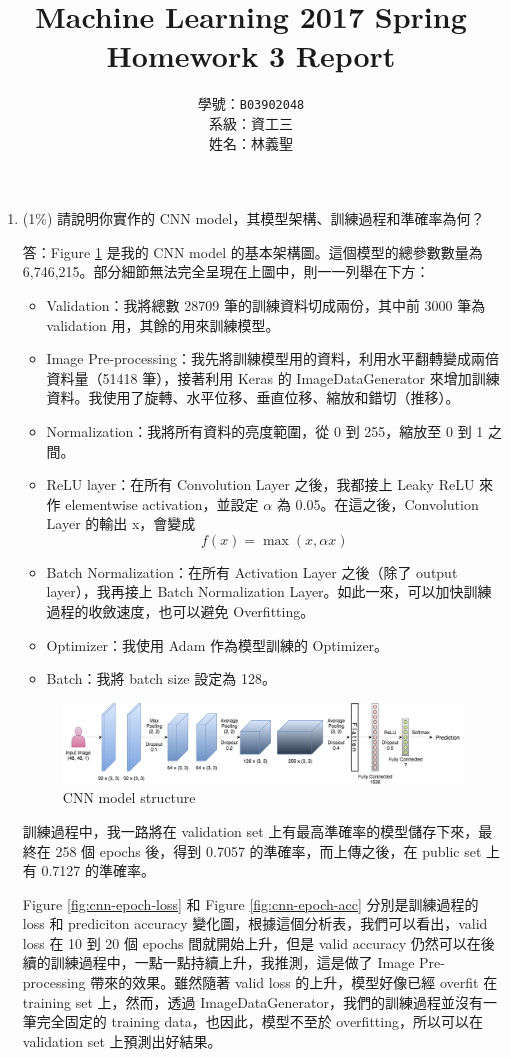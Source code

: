 \documentclass[12pt,a4paper]{extarticle}
\title{Machine Learning 2017 Spring\\Homework 3 Report}
\author{學號：\texttt{B03902048}\\系級：資工三\\姓名：林義聖}
\date{}
\begin{document}
\maketitle

\begin{enumerate}
	\item (1\%) 請說明你實作的 CNN model，其模型架構、訓練過程和準確率為何？
	\par 答：Figure \ref{fig:cnn-model-structure} 是我的 CNN model 的基本架構圖。這個模型的總參數數量為 6,746,215。部分細節無法完全呈現在上圖中，則一一列舉在下方：
  \begin{itemize}
    \item Validation：我將總數 28709 筆的訓練資料切成兩份，其中前 3000 筆為 validation 用，其餘的用來訓練模型。
    \item Image Pre-processing：我先將訓練模型用的資料，利用水平翻轉變成兩倍資料量（51418 筆），接著利用 Keras 的 ImageDataGenerator 來增加訓練資料。我使用了旋轉、水平位移、垂直位移、縮放和錯切（推移）。
    \item Normalization：我將所有資料的亮度範圍，從 0 到 255，縮放至 0 到 1 之間。
    \item ReLU layer：在所有 Convolution Layer 之後，我都接上 Leaky ReLU 來作 elementwise activation，並設定 $\alpha$ 為 0.05。在這之後，Convolution Layer 的輸出 x，會變成
    $$f(x) = \max(x, \alpha x)$$
    \item Batch Normalization：在所有 Activation Layer 之後（除了 output layer），我再接上 Batch Normalization Layer。如此一來，可以加快訓練過程的收斂速度，也可以避免 Overfitting。
    \item Optimizer：我使用 Adam 作為模型訓練的 Optimizer。
    \item Batch：我將 batch size 設定為 128。
  \end{itemize}

  \begin{figure}[ht]
    \centering
    \includegraphics[width=0.9\linewidth]{images/cnn_model_structure.png}
    \caption{CNN model structure}
    \label{fig:cnn-model-structure}
  \end{figure}

  \par 訓練過程中，我一路將在 validation set 上有最高準確率的模型儲存下來，最終在 258 個 epochs 後，得到 0.7057 的準確率，而上傳之後，在 public set 上有 0.7127 的準確率。
  \par Figure \ref{fig:cnn-epoch-loss} 和 Figure \ref{fig:cnn-epoch-acc} 分別是訓練過程的 loss 和 prediciton accuracy 變化圖，根據這個分析表，我們可以看出，valid loss 在 10 到 20 個 epochs 間就開始上升，但是 valid accuracy 仍然可以在後續的訓練過程中，一點一點持續上升，我推測，這是做了 Image Pre-processing 帶來的效果。雖然隨著 valid loss 的上升，模型好像已經 overfit 在 training set 上，然而，透過 ImageDataGenerator，我們的訓練過程並沒有一筆完全固定的 training data，也因此，模型不至於 overfitting，所以可以在 validation set 上預測出好結果。


\end{enumerate}
\end{document}
